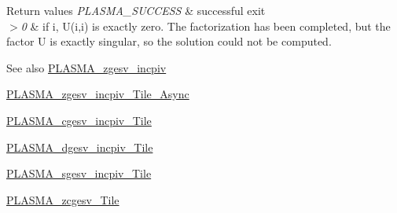 \begin{DoxyRetVals}{Return values}
{\em P\+L\+A\+S\+M\+A\+\_\+\+S\+U\+C\+C\+E\+S\+S} & successful exit \\
\hline
{\em $>$0} & if i, U(i,i) is exactly zero. The factorization has been completed, but the factor U is exactly singular, so the solution could not be computed.\\
\hline
\end{DoxyRetVals}
\begin{DoxySeeAlso}{See also}
\hyperlink{group__PLASMA__Complex64__t_ga27916109c8ac4bed6d101fcb98b27fad_ga27916109c8ac4bed6d101fcb98b27fad}{P\+L\+A\+S\+M\+A\+\_\+zgesv\+\_\+incpiv} 

\hyperlink{group__PLASMA__Complex64__t__Tile__Async_ga249ca8742ffa280cbd62c4bdad362ee7_ga249ca8742ffa280cbd62c4bdad362ee7}{P\+L\+A\+S\+M\+A\+\_\+zgesv\+\_\+incpiv\+\_\+\+Tile\+\_\+\+Async} 

\hyperlink{group__PLASMA__Complex32__t__Tile_gab1c5537b504823d7d8deea6b0511bebc_gab1c5537b504823d7d8deea6b0511bebc}{P\+L\+A\+S\+M\+A\+\_\+cgesv\+\_\+incpiv\+\_\+\+Tile} 

\hyperlink{group__double__Tile_ga157e467687c4ed3a51a28adf392783af_ga157e467687c4ed3a51a28adf392783af}{P\+L\+A\+S\+M\+A\+\_\+dgesv\+\_\+incpiv\+\_\+\+Tile} 

\hyperlink{group__float__Tile_gae9d3d027fb34165de038eaa5d0bcebec_gae9d3d027fb34165de038eaa5d0bcebec}{P\+L\+A\+S\+M\+A\+\_\+sgesv\+\_\+incpiv\+\_\+\+Tile} 

\hyperlink{group__PLASMA__Complex64__t__Tile_ga1323bdbc5973b2ee613e9c128a98d419_ga1323bdbc5973b2ee613e9c128a98d419}{P\+L\+A\+S\+M\+A\+\_\+zcgesv\+\_\+\+Tile} 
\end{DoxySeeAlso}
\hypertarget{group__PLASMA__Complex64__t__Tile_gae332d3896516a34f413881d7383506d4_gae332d3896516a34f413881d7383506d4}{}
